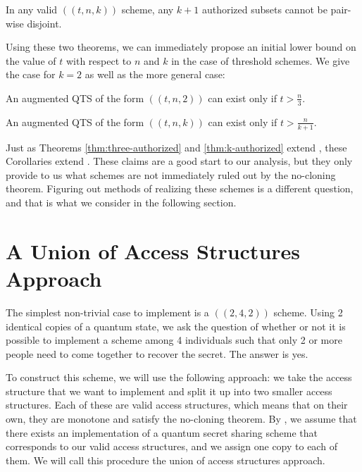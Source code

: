 \begin{theorem}
    \label{thm:k-authorized}
    In any valid $((t,n,k))$ scheme, any $k+1$ authorized subsets cannot be pair-wise disjoint.
\end{theorem}

Using these two theorems, we can immediately propose an initial lower bound on the value of $t$ with respect to $n$ and $k$ in the case of threshold schemes. We give the case for $k=2$ as well as the more general case:

\begin{corollary}
	\label{cor:qts2}
	An augmented QTS of the form $((t,n, 2))$ can exist only if $t > \frac{n}{3}$.
\end{corollary}

\begin{corollary}
	\label{cor:qtsk}
	An augmented QTS of the form $((t,n, k))$ can exist only if $t > \frac{n}{k+1}$.
\end{corollary}

Just as Theorems \ref{thm:three-authorized} and \ref{thm:k-authorized} extend , these Corollaries extend . These claims are a good start to our analysis, but they only provide to us what schemes are not immediately ruled out by the no-cloning theorem. Figuring out methods of realizing these schemes is a different question, and that is what we consider in the following section.

\section{A Union of Access Structures Approach}
\label{sec:union-access-structures}

The simplest non-trivial case to implement is a $((2,4,2))$ scheme. Using 2 identical copies of a quantum state, we ask the question of whether or not it is possible to implement a scheme among 4 individuals such that only 2 or more people need to come together to recover the secret. The answer is yes.

To construct this scheme, we will use the following approach: we take the access structure that we want to implement and split it up into two smaller access structures. Each of these are valid access structures, which means that on their own, they are monotone and satisfy the no-cloning theorem. By , we assume that there exists an implementation of a quantum secret sharing scheme that corresponds to our valid access structures, and we assign one copy to each of them. We will call this procedure the union of access structures approach.

